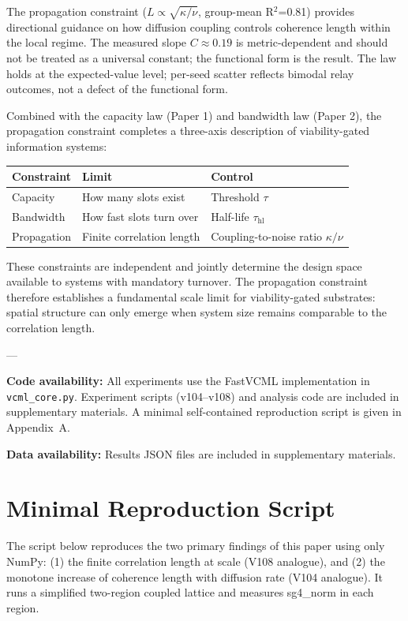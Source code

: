 \documentclass[11pt]{article}
\begin{document}
The propagation constraint ($L \propto \sqrt{\kappa/\nu}$, group-mean R$^2$=0.81) provides directional guidance on how diffusion coupling controls coherence length within the local regime. The measured slope $C \approx 0.19$ is metric-dependent and should not be treated as a universal constant; the functional form is the result. The law holds at the expected-value level; per-seed scatter reflects bimodal relay outcomes, not a defect of the functional form.

Combined with the capacity law (Paper 1) and bandwidth law (Paper 2), the propagation constraint completes a three-axis description of viability-gated information systems:

\begin{table}[h]
\centering
\begin{tabular}{lll}
\hline
\textbf{Constraint} & \textbf{Limit} & \textbf{Control} \\
\hline
Capacity & How many slots exist & Threshold $\tau$ \\
Bandwidth & How fast slots turn over & Half-life $\tau_{\text{hl}}$ \\
Propagation & Finite correlation length & Coupling-to-noise ratio $\kappa/\nu$ \\
\hline
\end{tabular}
\end{table}

These constraints are independent and jointly determine the design space available to systems with mandatory turnover. The propagation constraint therefore establishes a fundamental scale limit for viability-gated substrates: spatial structure can only emerge when system size remains comparable to the correlation length.

---

\textbf{Code availability:} All experiments use the FastVCML implementation in \texttt{vcml\_core.py}. Experiment scripts (v104--v108) and analysis code are included in supplementary materials. A minimal self-contained reproduction script is given in Appendix~A.

\textbf{Data availability:} Results JSON files are included in supplementary materials.

\appendix
\section{Minimal Reproduction Script}

The script below reproduces the two primary findings of this paper using only NumPy: (1) the finite correlation length at scale (V108 analogue), and (2) the monotone increase of coherence length with diffusion rate (V104 analogue). It runs a simplified two-region coupled lattice and measures sg4\_norm in each region.
\end{document}
